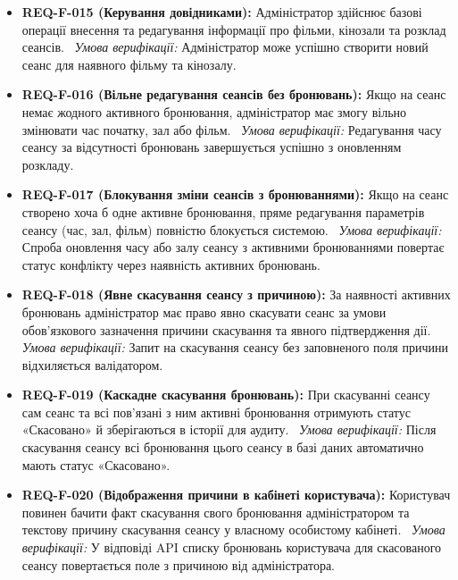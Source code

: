 \begin{itemize}[leftmargin=*,labelindent=0pt]
    \item \textbf{REQ-F-015 (Керування довідниками):} Адміністратор здійснює базові операції внесення та редагування інформації про фільми, кінозали та розклад сеансів.~
    \textit{Умова верифікації:} Адміністратор може успішно створити новий сеанс для наявного фільму та кінозалу.
    
    \item \textbf{REQ-F-016 (Вільне редагування сеансів без бронювань):} Якщо на сеанс немає жодного активного бронювання, адміністратор має змогу вільно змінювати час початку, зал або фільм.~
    \textit{Умова верифікації:} Редагування часу сеансу за відсутності бронювань завершується успішно з оновленням розкладу.
    
    \item \textbf{REQ-F-017 (Блокування зміни сеансів з бронюваннями):} Якщо на сеанс створено хоча б одне активне бронювання, пряме редагування параметрів сеансу (час, зал, фільм) повністю блокується системою.~
    \textit{Умова верифікації:} Спроба оновлення часу або залу сеансу з активними бронюваннями повертає статус конфлікту через наявність активних бронювань.
    
    \item \textbf{REQ-F-018 (Явне скасування сеансу з причиною):} За наявності активних бронювань адміністратор має право явно скасувати сеанс за умови обов'язкового зазначення причини скасування та явного підтвердження дії.~
    \textit{Умова верифікації:} Запит на скасування сеансу без заповненого поля причини відхиляється валідатором.
    
    \item \textbf{REQ-F-019 (Каскадне скасування бронювань):} При скасуванні сеансу сам сеанс та всі пов'язані з ним активні бронювання отримують статус «Скасовано» й зберігаються в історії для аудиту.~
    \textit{Умова верифікації:} Після скасування сеансу всі бронювання цього сеансу в базі даних автоматично мають статус «Скасовано».
    
    \item \textbf{REQ-F-020 (Відображення причини в кабінеті користувача):} Користувач повинен бачити факт скасування свого бронювання адміністратором та текстову причину скасування сеансу у власному особистому кабінеті.~
    \textit{Умова верифікації:} У відповіді API списку бронювань користувача для скасованого сеансу повертається поле з причиною від адміністратора.
\end{itemize}
